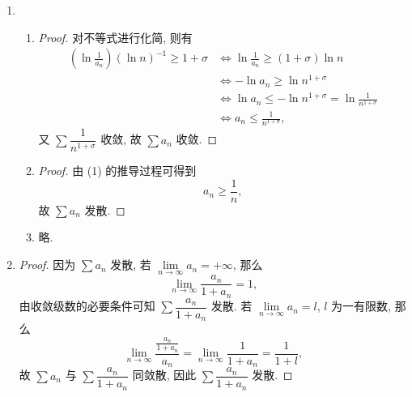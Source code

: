\begin{enumerate}
\begin{proof}
            当 $\delta = 0$ 时, 则有
            \[
                n^{-1/2}\sqrt{a_n} = \sqrt{\frac{a_n}{n}} = \sqrt{\frac1n\cdot a_n} \geq \frac{2}{n + \frac{1}{a_n}},    
            \]
            又因 $\sum a_n$ 收敛, 有极限 $\lim a_n = 0$, 故数列 $\{a_n\}$ 有界, 即 $a_n \leq M$, 那么
            \[
                \frac{2}{n + \frac{1}{a_n}} \geq \frac{2}{n + \frac{1}{M}}.    
            \]
            $\sum\dfrac{2}{n + \frac{1}{M}}$ 显然与 $\sum\dfrac1n$ 同敛散. 故 $\sum\sqrt{\dfrac{a_n}{n}}$ 发散.
        \end{proof}
    \item %
        \begin{enumerate}[(1)]
            \item %
                \begin{proof}
                    对不等式进行化简, 则有
                    \begin{align*}
                        \left(\ln\frac{1}{a_n}\right)(\ln n)^{-1} \geq 1 + \sigma &\Leftrightarrow \ln\frac{1}{a_n} \geq (1+\sigma)\ln n \\
                        &\Leftrightarrow -\ln a_n \geq \ln n^{1+\sigma} \\
                        &\Leftrightarrow \ln a_n \leq -\ln n^{1+\sigma} = \ln\frac{1}{n^{1+\sigma}} \\
                        &\Leftrightarrow a_n \leq \frac{1}{n^{1+\sigma}},
                    \end{align*}
                    又 $\sum\dfrac{1}{n^{1+\sigma}}$ 收敛, 故 $\sum a_n$ 收敛.
                \end{proof}
            \item %
                \begin{proof}
                    由 (1) 的推导过程可得到
                    \[
                        a_n \geq \frac1n,    
                    \]
                    故 $\sum a_n$ 发散.
                \end{proof}
            \item %
                略.
        \end{enumerate}
    \item %
        \begin{proof}
            因为 $\sum a_n$ 发散, 若 $\lim\limits_{n\to\infty}a_n = +\infty$, 那么
            \[
                \lim_{n\to\infty}\frac{a_n}{1+a_n} = 1,   
            \]
            由收敛级数的必要条件可知 $\sum\dfrac{a_n}{1+a_n}$ 发散. 若 $\lim\limits_{n\to\infty}a_n = l$, $l$ 为一有限数, 那么
            \[
                \lim_{n\to\infty}\frac{\frac{a_n}{1+a_n}}{a_n} = \lim_{n\to\infty}\frac{1}{1+a_n} = \frac{1}{1+l},
            \]
            故 $\sum a_n$ 与 $\sum \dfrac{a_n}{1+a_n}$ 同敛散, 因此 $\sum\dfrac{a_n}{1+a_n}$ 发散.


\end{proof}
\end{enumerate}

